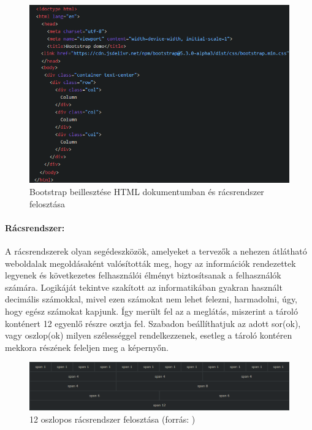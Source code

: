 \begin{figure}[h]
\centering
\includegraphics[scale=0.5]{images/bootstrap.png}
\caption{Bootstrap beillesztése HTML dokumentumban és rácsrendszer felosztása }
\end{figure}

\paragraph{Rácsrendszer:}

A rácsrendszerek olyan segédeszközök, amelyeket a tervezők a nehezen átlátható weboldalak megoldásaként valósították meg, hogy az információk rendezettek legyenek és következetes felhasználói élményt biztosítsanak a felhasználók számára. Logikáját tekintve szakított az informatikában gyakran használt decimális számokkal, mivel ezen számokat nem lehet felezni, harmadolni, úgy, hogy egész számokat kapjunk. Így merült fel az a meglátás, miszerint a tároló konténert 12 egyenlő részre osztja fel. Szabadon beállíthatjuk az adott sor(ok), vagy oszlop(ok) milyen szélességgel rendelkezzenek, esetleg a tároló kontéren mekkora részének feleljen meg a képernyőn.

\begin{figure}[h]
\centering
\includegraphics[scale=0.4]{images/gridSystem.png}
\caption{12 oszlopos rácsrendszer felosztása (forrás: \cite{gridSystem})}
\end{figure}

